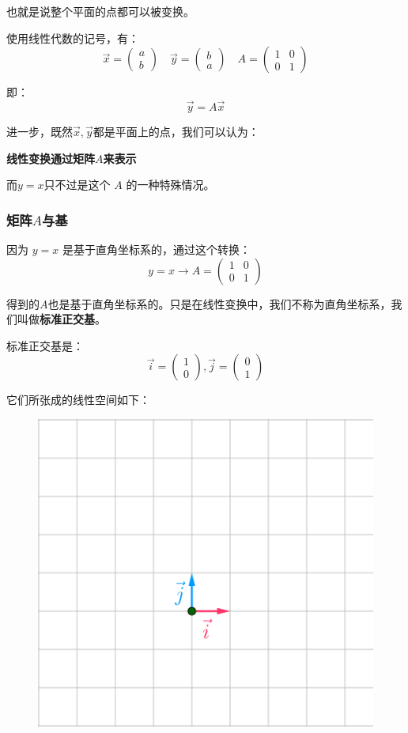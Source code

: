 \documentclass[12pt]{article}
\begin{document}
也就是说整个平面的点都可以被变换。

使用线性代数的记号，有：
$$
\vec{x} = \begin{pmatrix}
a \\ b
\end{pmatrix} \quad
\vec{y} = \begin{pmatrix}
b \\ a
\end{pmatrix} \quad
A = \begin{pmatrix}
1&0 \\ 0&1
\end{pmatrix}
$$

即：
$$
\vec{y} = A\vec{x}
$$

进一步，既然$\vec{x},\vec{y}$都是平面上的点，我们可以认为：
\begin{center}
\textbf{线性变换通过矩阵$A$来表示}
\end{center}

而$y=x$只不过是这个 $A$ 的一种特殊情况。

\subsubsection{矩阵$A$与基}
因为 $y=x$ 是基于直角坐标系的，通过这个转换：
$$
y = x \rightarrow A = \begin{pmatrix}
1&0 \\ 0&1
\end{pmatrix}
$$

得到的$A$也是基于直角坐标系的。只是在线性变换中，我们不称为直角坐标系，我们叫做\textbf{标准正交基}。

标准正交基是：
$$
\vec{i} = \begin{pmatrix}1\\0\end{pmatrix}, \vec{j} = \begin{pmatrix}0\\1\end{pmatrix}
$$

它们所张成的线性空间如下：
\begin{figure}[H]
\centering
\includegraphics[width=.3\textwidth]{fig/UnderstandSimilarMatrix_2.png} 
\end{figure}
\end{document}
